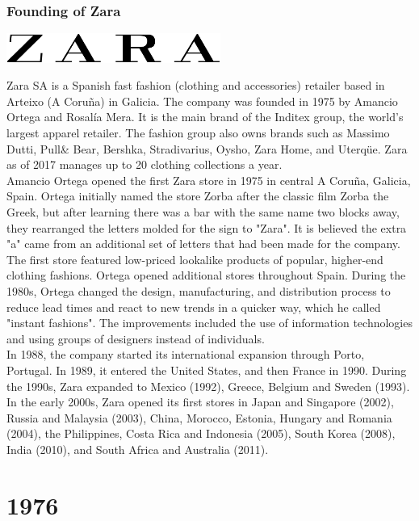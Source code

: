 \documentclass[11pt]{report}
\begin{document}
\subsection{Founding of Zara}
\vspace{2mm}\begin{center}\includegraphics[width=7cm]{./img/zaraLogo.jpg}\end{center}
Zara SA is a Spanish fast fashion (clothing and accessories) retailer based in Arteixo (A Coruña) in Galicia. The company was founded in 1975 by Amancio Ortega and Rosalía Mera. It is the main brand of the Inditex group, the world's largest apparel retailer. The fashion group also owns brands such as Massimo Dutti, Pull\& Bear, Bershka, Stradivarius, Oysho, Zara Home, and Uterqüe. Zara as of 2017 manages up to 20 clothing collections a year.\\
\indent Amancio Ortega opened the first Zara store in 1975 in central A Coruña, Galicia, Spain. Ortega initially named the store Zorba after the classic film Zorba the Greek, but after learning there was a bar with the same name two blocks away, they rearranged the letters molded for the sign to "Zara". It is believed the extra "a" came from an additional set of letters that had been made for the company. The first store featured low-priced lookalike products of popular, higher-end clothing fashions. Ortega opened additional stores throughout Spain. During the 1980s, Ortega changed the design, manufacturing, and distribution process to reduce lead times and react to new trends in a quicker way, which he called "instant fashions". The improvements included the use of information technologies and using groups of designers instead of individuals.\\ \indent In 1988, the company started its international expansion through Porto, Portugal. In 1989, it entered the United States, and then France in 1990. During the 1990s, Zara expanded to Mexico (1992), Greece, Belgium and Sweden (1993). In the early 2000s, Zara opened its first stores in Japan and Singapore (2002), Russia and Malaysia (2003), China, Morocco, Estonia, Hungary and Romania (2004), the Philippines, Costa Rica and Indonesia (2005), South Korea (2008), India (2010), and South Africa and Australia (2011).

\chapter{1976}
\end{document}
